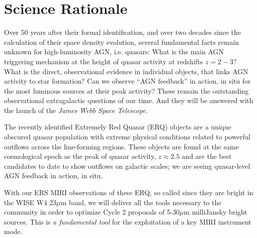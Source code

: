 \section*{Science Rationale}
\iffalse
\begin{quote}
{\it ``Observations with HST have confirmed that most nearby galaxies harbor supermassive black holes in their nuclei.
How do these supermassive black holes form and evolve? Do they grow from stellar “seeds” or do they originate at the very beginning of the formation of a galaxy? These key questions are ripe for a frontal attack now. Addressing them will require the observation of active galactic nuclei (AGNs) when they first turn on, over the entire electromagnetic spectrum. With its enormous sensitivity in the infrared, NGST will be able to detect AGNs out to redshifts beyond 10.''} \\
-- Astronomy and Astrophysics in the New Millennium (2000-2010 Decadal Survey). 
\end{quote}
\fi

\smallskip \smallskip
\noindent
Over 50 years after their formal identification, and over two decades since the calculation of their space density evolution, several fundamental facts remain unknown for high-luminosity AGN, i.e. quasars: What is the main AGN triggering mechanism at the height of quasar activity at redshifts $z=2-3$? What is the direct, observational evidence in individual objects, that links AGN activity to star formation?  Can we observe ``AGN feedback'' in action, in situ for the most luminous sources at their peak activity? These remain the outstanding observational extragalactic questions of our time. And they will be answered with the launch of the {\it James Webb Space Telescope}.

\smallskip \smallskip
\noindent
The recently identified Extremely Red Quasar (ERQ) objects are a
unique obscured quasar population with extreme physical conditions
related to powerful outflows across the line-forming regions. These
objects are found at the same cosmological epoch as the peak of quasar
activity, $z\approx2.5$ and are the best candidates to date to show
outflows on galactic scales; we are seeing quasar-level AGN feedback
in action, in situ. 

\smallskip \smallskip
\noindent
With our ERS MIRI observations of these ERQ, so called since they are
bright in the WISE W4 23$\mu$m band, we will deliver all the tools
necessary to the community in order to optimize Cycle 2 proposals of
5-30$\mu$m milliJansky bright sources. This is {\it a fundamental
tool} for the exploitation of a key MIRI instrument mode.

